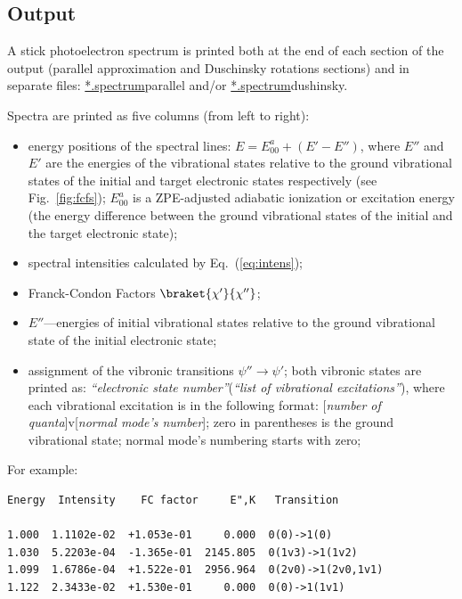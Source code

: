 \documentclass[11pt]{article}
\begin{document}
\subsection{Output}
\label{sec:output}

A stick photoelectron spectrum is printed both at the end of each section of the output 
(parallel approximation and Duschinsky rotations sections)
and in separate files: \ul{*.spectrum}{parallel} and/or \ul{*.spectrum}{dushinsky}.

Spectra are printed as five columns (from left to right):
\begin{itemize}
\item energy positions of the spectral lines: $E=E^a_{00}+(E'-E'')$, where $E''$ and $E'$ are the energies
of the vibrational states relative to the ground vibrational states of the initial and target
electronic states respectively (see Fig.~\ref{fig:fcfs}); 
$E^a_{00}$ is a ZPE-adjusted adiabatic ionization or excitation energy 
(the energy difference between the ground vibrational states of the initial and the target electronic state);
\item spectral intensities calculated by Eq.~(\ref{eq:intens});
\item Franck-Condon Factors $\braket{\chi '}{\chi''}$;
\item $E''$---energies of initial vibrational states relative to the ground vibrational state 
of the initial electronic state;
\item assignment of the vibronic transitions $\psi''\to\psi '$; both vibronic states are
printed as: {\em ``electronic state number''}({\em``list of vibrational excitations''}), 
where each vibrational excitation is in the following format: [{\em number of quanta}]v[{\em normal mode's number}];
zero in parentheses is the ground vibrational state; normal mode's numbering starts with zero;
\end{itemize}

For example:
\begin{lstlisting}[frame=single,framerule=0pt]
Energy  Intensity    FC factor     E",K   Transition

1.000  1.1102e-02  +1.053e-01     0.000  0(0)->1(0)
1.030  5.2203e-04  -1.365e-01  2145.805  0(1v3)->1(1v2)
1.099  1.6786e-04  +1.522e-01  2956.964  0(2v0)->1(2v0,1v1)
1.122  2.3433e-02  +1.530e-01     0.000  0(0)->1(1v1)
\end{lstlisting}
\end{document}
